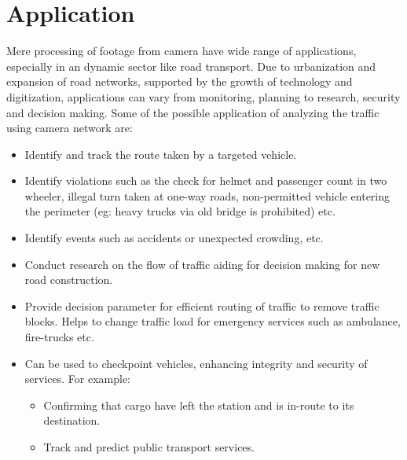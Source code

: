 \section{Application}
Mere processing of footage from camera have wide range of applications, especially in an dynamic sector like road transport. Due to urbanization and expansion of road networks, supported by the growth of technology and digitization, applications can vary from monitoring, planning to research, security and decision making. Some of the possible application of analyzing the traffic using camera network are:
\begin{itemize}
	\item Identify and track the route taken by a targeted vehicle.
	\item Identify violations such as the check for helmet and passenger count in two wheeler, illegal turn taken at one-way roads, non-permitted vehicle entering the perimeter (eg: heavy trucks via old bridge is prohibited) etc.
	\item Identify events such as accidents or unexpected crowding, etc.
	\item Conduct research on the flow of traffic aiding for decision making for new road construction.
	\item Provide decision parameter for efficient routing of traffic to remove traffic blocks. Helps to change traffic load for emergency services such as ambulance, fire-trucks etc.
	\item Can be used to checkpoint vehicles, enhancing integrity and security of services. For example:
	\begin{itemize}
		\item Confirming that cargo have left the station and is in-route to its destination.
		\item Track and predict public transport services.
	\end{itemize}
\end{itemize}
